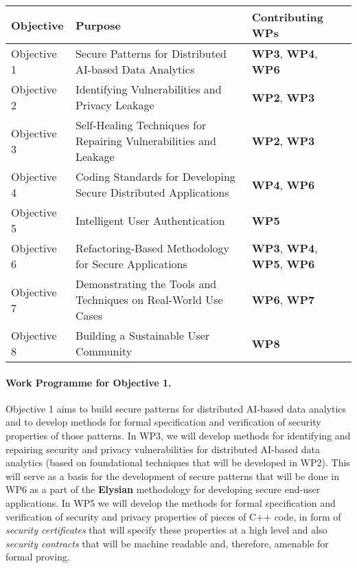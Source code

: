 \documentclass[a4paper,11pt]{article}
\newcommand{\project}[1]{\textbf{#1}\xspace}
\newcommand{\SECURITY}{\project{Elysian}}
\newcommand{\TheProject}{\SECURITY}
\begin{document}
\vspace{-8pt}
\begin{center}
\begin{tabular}{|l|l|l|}\hline
\textbf{Objective} & \textbf{Purpose} & \textbf{Contributing WPs} \\\hline \hline
Objective 1 & Secure Patterns for Distributed AI-based Data Analytics & \textbf{WP3}, \textbf{WP4}, \textbf{WP6} \\\hline
Objective 2 & Identifying Vulnerabilities and Privacy Leakage & \textbf{WP2}, \textbf{WP3} \\\hline
Objective 3 & Self-Healing Techniques for Repairing Vulnerabilities and Leakage & \textbf{WP2}, \textbf{WP3} \\\hline
Objective 4 & Coding Standards for Developing Secure Distributed Applications & \textbf{WP4}, \textbf{WP6} \\\hline
Objective 5 & Intelligent User Authentication & \textbf{WP5} \\\hline
Objective 6 & Refactoring-Based Methodology for Secure Applications & \textbf{WP3}, \textbf{WP4}, \textbf{WP5}, \textbf{WP6} \\\hline
Objective 7 & Demonstrating the Tools and Techniques on Real-World Use Cases & \textbf{WP6}, \textbf{WP7}\\\hline
Objective 8 & Building a Sustainable User Community & \textbf{WP8}\\\hline
\end{tabular}
\end{center}

\paragraph*{Work Programme for Objective 1.}

Objective 1 aims to build secure patterns for distributed AI-based data analytics and to develop methods for formal specification and verification of security properties of those patterns. In WP3, we will develop methods for identifying and repairing security and privacy vulnerabilities for distributed AI-based data analytics (based on foundational techniques that will be developed in WP2). This will serve as a basis for the development of secure patterns that will be done in WP6 as a part of the \TheProject{} methodology for developing secure end-user applications. In WP5 we will develop the methods for formal specification and verification of security and privacy properties of pieces of C++ code, in form of \emph{security certificates} that will specify these properties at a high level and also \emph{security contracts} that will be machine readable and, therefore, amenable for formal proving. 
\end{document}
